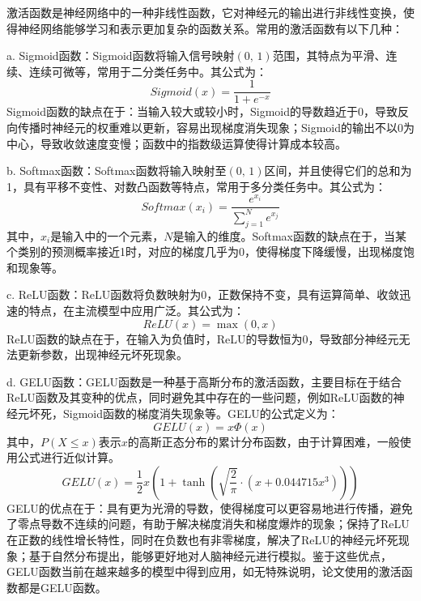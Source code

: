 激活函数是神经网络中的一种非线性函数，它对神经元的输出进行非线性变换，使得神经网络能够学习和表示更加复杂的函数关系。常用的激活函数有以下几种：

a. Sigmoid函数：Sigmoid函数将输入信号映射\((0,\,1)\)范围，其特点为平滑、连续、连续可微等，常用于二分类任务中。其公式为：
\begin{equation}
    Sigmoid(x) = \frac{1}{1 + e^{-x}}
    \label{eq:sigmoid}
\end{equation}
Sigmoid函数的缺点在于：当输入较大或较小时，Sigmoid的导数趋近于0，导致反向传播时神经元的权重难以更新，容易出现梯度消失现象；Sigmoid的输出不以0为中心，导致收敛速度变慢；函数中的指数级运算使得计算成本较高。

b. Softmax函数：Softmax函数将输入映射至\((0,\,1)\)区间，并且使得它们的总和为1，具有平移不变性、对数凸函数等特点，常用于多分类任务中。其公式为：
\begin{equation}
    Softmax(x_i) = \frac{e^{x_i}}{\sum_{j=1}^{N} e^{x_j}}
    \label{eq:softmax}
\end{equation}
其中，\(x_i\)是输入中的一个元素，\(N\)是输入的维度。Softmax函数的缺点在于，当某个类别的预测概率接近1时，对应的梯度几乎为0，使得梯度下降缓慢，出现梯度饱和现象等。

c. ReLU函数\cite{glorot2011proceedings}：ReLU函数将负数映射为0，正数保持不变，具有运算简单、收敛迅速的特点，在主流模型中应用广泛。其公式为：
\begin{equation}
    ReLU(x) = \max(0, x)
    \label{eq:relu}
\end{equation}
ReLU函数的缺点在于，在输入为负值时，ReLU的导数恒为0，导致部分神经元无法更新参数，出现神经元坏死现象。

d. GELU函数\cite{hendrycks2016gaussian}：GELU函数是一种基于高斯分布的激活函数，主要目标在于结合ReLU函数及其变种的优点，同时避免其中存在的一些问题，例如ReLU函数的神经元坏死，Sigmoid函数的梯度消失现象等。GELU的公式定义为：
\begin{equation}
    GELU(x) = x\Phi(x)
    \label{eq:gelu1}
\end{equation}
其中，\(P(X \le x)\)表示\(x\)的高斯正态分布的累计分布函数，由于计算困难，一般使用公式进行近似计算。
\begin{equation}
    GELU(x) = \frac{1}{2}x\left(1 + \tanh\left(\sqrt{\frac{2}{\pi}} \cdot \left(x + 0.044715x^3\right)\right)\right)
    \label{eq:gelu2}
\end{equation}
GELU的优点在于：具有更为光滑的导数，使得梯度可以更容易地进行传播，避免了零点导数不连续的问题，有助于解决梯度消失和梯度爆炸的现象；保持了ReLU在正数的线性增长特性，同时在负数也有非零梯度，解决了ReLU的神经元坏死现象；基于自然分布提出，能够更好地对人脑神经元进行模拟。鉴于这些优点，GELU函数当前在越来越多的模型中得到应用，如无特殊说明，论文使用的激活函数都是GELU函数。

